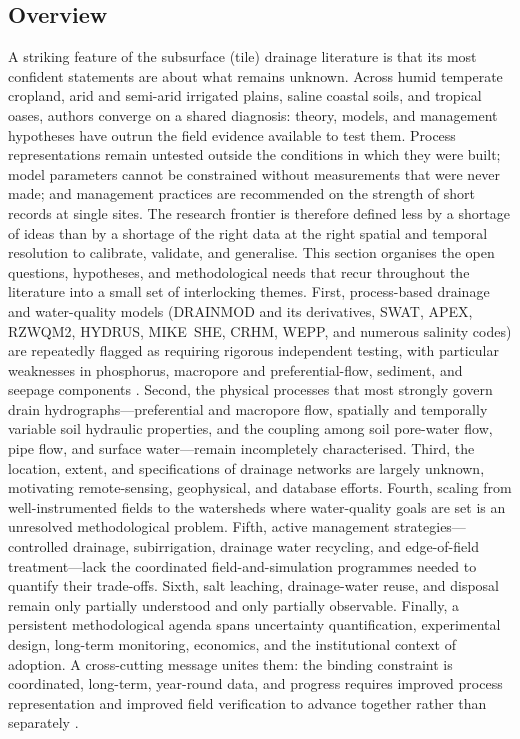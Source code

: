 \subsection{Overview}

A striking feature of the subsurface (tile) drainage literature is that its
most confident statements are about what remains unknown. Across humid
temperate cropland, arid and semi-arid irrigated plains, saline coastal soils,
and tropical oases, authors converge on a shared diagnosis: theory, models,
and management hypotheses have outrun the field evidence available to test
them. Process representations remain untested outside the conditions in which
they were built; model parameters cannot be constrained without measurements
that were never made; and management practices are recommended on the strength
of short records at single sites. The research frontier is therefore defined
less by a shortage of ideas than by a shortage of the right data at the right
spatial and temporal resolution to calibrate, validate, and generalise. This
section organises the open questions, hypotheses, and methodological needs
that recur throughout the literature into a small set of interlocking themes.
First, process-based drainage and water-quality models (DRAINMOD and its
derivatives, SWAT, APEX, RZWQM2, HYDRUS, MIKE~SHE, CRHM, WEPP, and numerous
salinity codes) are repeatedly flagged as requiring rigorous independent
testing, with particular weaknesses in phosphorus, macropore and
preferential-flow, sediment, and seepage components
\parencite{Youssef2006,Askar2021b,Askar2025,Radcliffe2015,Williams2016}.
Second, the physical processes that most strongly govern drain
hydrographs---preferential and macropore flow, spatially and temporally
variable soil hydraulic properties, and the coupling among soil pore-water
flow, pipe flow, and surface water---remain incompletely characterised. Third,
the location, extent, and specifications of drainage networks are largely
unknown, motivating remote-sensing, geophysical, and database efforts. Fourth,
scaling from well-instrumented fields to the watersheds where water-quality
goals are set is an unresolved methodological problem. Fifth, active management
strategies---controlled drainage, subirrigation, drainage water recycling, and
edge-of-field treatment---lack the coordinated field-and-simulation programmes
needed to quantify their trade-offs. Sixth, salt leaching, drainage-water
reuse, and disposal remain only partially understood and only partially
observable. Finally, a persistent methodological agenda spans uncertainty
quantification, experimental design, long-term monitoring, economics, and the
institutional context of adoption. A cross-cutting message unites them: the
binding constraint is coordinated, long-term, year-round data, and progress
requires improved process representation and improved field verification to
advance together rather than separately
\parencite{Kladivko2001,Sharpley2019,Frankenberger2024,Schilling2008,Bauwe2016,Zhou2025}.

